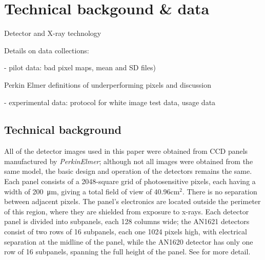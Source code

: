 \documentclass[\main/IO-Pixels.tex]{subfiles}
\begin{document}
 
 
\section{Technical backgound \& data}
\begin{outline}
Detector and X-ray technology

Details on data collections: 

- pilot data: bad pixel maps, mean and SD files)

  Perkin Elmer definitions of underperforming pixels and discussion
  
- experimental data: protocol for white image test data, usage data
\end{outline}

\subsection{Technical background}

All of the detector images used in this paper were obtained from CCD panels manufactured by \textit{PerkinElmer}; although not all images were obtained from the same model, the basic design and operation of the detectors remains the same. Each panel consists of a 2048-square grid of photosensitive pixels, each having a width of \SI{200}{\micro\meter}, giving a total field of view of 40.96cm$^2$. There is no separation between adjacent pixels. The panel's electronics are located outside the perimeter of this region, where they are shielded from exposure to x-rays. Each detector panel is divided into subpanels, each 128 columns wide; the AN1621 detectors consist of two rows of 16 subpanels, each one 1024 pixels high, with electrical separation at the midline of the panel, while the AN1620 detector has only one row of 16 subpanels, spanning the full height of the panel. See \cite{PerkinElmerManual} for more detail.
\end{document}
